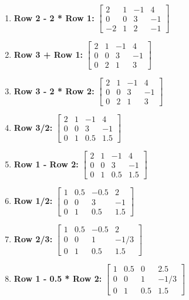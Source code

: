 \documentclass[11pt]{article}
\begin{document}
\begin{enumerate}
\def\labelenumi{\arabic{enumi}.}
\item
  \textbf{Row 2 - 2 * Row 1:} $ \begin{bmatrix} 2 & 1 & -1 & 4 \\ 0 & 0 & 3 & -1 \\ -2 & 1 & 2 & -1 \end{bmatrix} $ 
\item
  \textbf{Row 3 + Row 1:} $ \begin{bmatrix} 2 & 1 & -1 & 4 \\ 0 & 0 & 3 & -1 \\ 0 & 2 & 1 & 3 \end{bmatrix} $ 
\item
  \textbf{Row 3 - 2 * Row 2:} $ \begin{bmatrix} 2 & 1 & -1 & 4 \\ 0 & 0 & 3 & -1 \\ 0 & 2 & 1 & 3 \end{bmatrix} $ 
\item
  \textbf{Row 3/2:} $ \begin{bmatrix} 2 & 1 & -1 & 4 \\ 0 & 0 & 3 & -1 \\ 0 & 1 & 0.5 & 1.5 \end{bmatrix}  $ 
\item
  \textbf{Row 1 - Row 2:} $ \begin{bmatrix} 2 & 1 & -1 & 4 \\ 0 & 0 & 3 & -1 \\ 0 & 1 & 0.5 & 1.5 \end{bmatrix}  $ 
\item
  \textbf{Row 1/2:} $ \begin{bmatrix} 1 & 0.5 & -0.5 & 2 \\ 0 & 0 & 3 & -1 \\ 0 & 1 & 0.5 & 1.5 \end{bmatrix} $ 
\item
  \textbf{Row 2/3:} $ \begin{bmatrix} 1 & 0.5 & -0.5 & 2 \\ 0 & 0 & 1 & -1/3 \\ 0 & 1 & 0.5 & 1.5 \end{bmatrix} $ 
\item
  \textbf{Row 1 - 0.5 * Row 2:} $ \begin{bmatrix} 1 & 0.5 & 0 & 2.5 \\ 0 & 0 & 1 & -1/3 \\ 0 & 1 & 0.5 & 1.5 \end{bmatrix} $ 

\end{enumerate}
\end{document}
